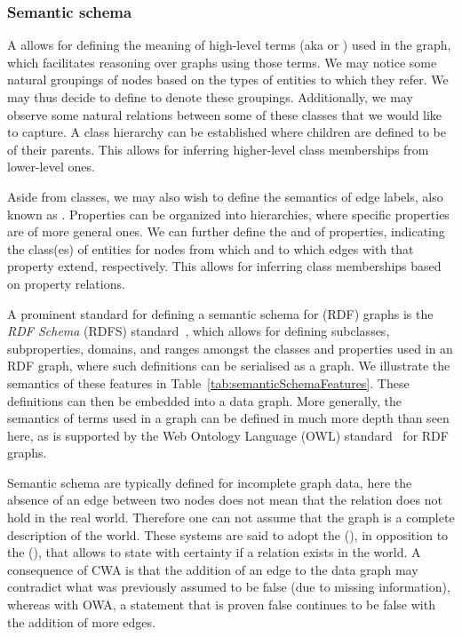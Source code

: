 \subsubsection{Semantic schema}\label{schema_semantic}
A  allows for defining the meaning of high-level terms (aka  or ) used in the graph, which facilitates reasoning over graphs using those terms. We may notice some natural groupings of nodes based on the types of entities to which they refer. We may thus decide to define  to denote these groupings. Additionally, we may observe some natural relations between some of these classes that we would like to capture. A class hierarchy can be established where children are defined to be  of their parents. This allows for inferring higher-level class memberships from lower-level ones.

Aside from classes, we may also wish to define the semantics of edge labels, also known as . Properties can be organized into hierarchies, where specific properties are  of more general ones. We can further define the  and  of properties, indicating the class(es) of entities for nodes from which and to which edges with that property extend, respectively. This allows for inferring class memberships based on property relations.

A prominent standard for defining a semantic schema for (RDF) graphs is the \textit{RDF Schema} (RDFS) standard~\cite{Brickley2014RDFSchema1.1}, which allows for defining subclasses, subproperties, domains, and ranges amongst the classes and properties used in an RDF graph, where such definitions can be serialised as a graph. We illustrate the semantics of these features in Table~\ref{tab:semanticSchemaFeatures}. These definitions can then be embedded into a data graph. More generally, the semantics of terms used in a graph can be defined in much more depth than seen here, as is supported by the Web Ontology Language (OWL) standard~\cite{Hitzler2014OWLPrimer} for RDF graphs.

Semantic schema are typically defined for incomplete graph data, here the absence of an edge between two nodes does not mean that the relation does not hold in the real world. Therefore one can not assume that the graph is a complete description of the world. These systems are said to adopt the  (), in opposition to the  (), that allows to state with certainty if a relation exists in the world. A consequence of CWA is that the addition of an edge to the data graph may contradict what was previously assumed to be false (due to missing information), whereas with OWA, a statement that is proven false continues to be false with the addition of more edges.

